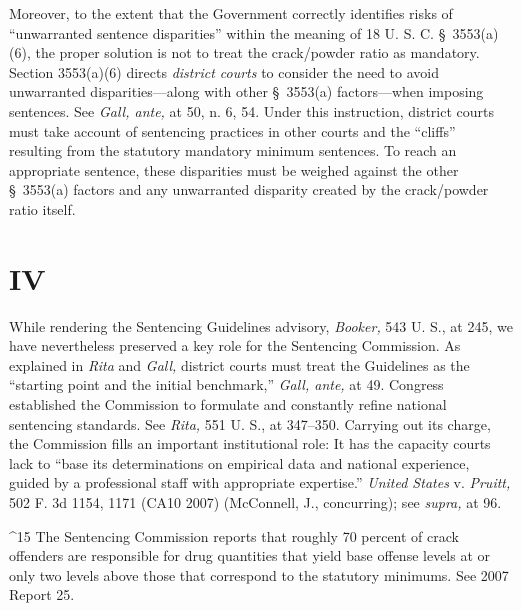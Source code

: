 {{  Moreover, to the extent that the Government correctly identifies risks
of ``unwarranted sentence disparities'' within the meaning of 18 U. S.
C. \S~3553(a)(6), the proper solution is not to treat the crack/powder
ratio as mandatory. Section 3553(a)(6) directs \emph{district courts} to
consider the need to avoid unwarranted disparities---along with other
\S~3553(a) factors---when imposing sentences. See \emph{Gall, ante,}
at 50, n. 6, 54. Under this instruction, district courts must take
account of sentencing practices in other courts and the ``cliffs''
resulting from the statutory mandatory minimum sentences. To reach an
appropriate sentence, these disparities must be weighed against the
other \S~3553(a) factors and any unwarranted disparity created by the
crack/powder ratio itself.

\section{IV}

  While rendering the Sentencing Guidelines advisory, \emph{Booker,}
543 U. S., at 245, we have nevertheless preserved a key role for the
Sentencing Commission. As explained in \emph{Rita} and \emph{Gall,} district
courts must treat the Guidelines as the ``starting point and the
initial benchmark,'' \emph{Gall, ante,} at 49. Congress established
the Commission to formulate and constantly refine national sentencing
standards. See \emph{Rita,} 551 U. S., at 347--350. Carrying out its
charge, the \newpage  Commission fills an important institutional role: It
has the capacity courts lack to ``base its determinations on empirical
data and national experience, guided by a professional staff with
appropriate expertise.'' \emph{United States} v. \emph{Pruitt,} 502 F. 3d
1154, 1171 (CA10 2007) (McConnell, J., concurring); see \emph{supra,} at
96. 

^15 The Sentencing Commission reports that roughly 70 percent of
crack offenders are responsible for drug quantities that yield base
offense levels at or only two levels above those that correspond to the
statutory minimums. See 2007 Report 25.

}}
